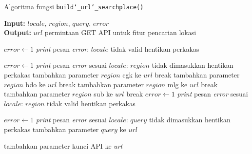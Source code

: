 \begin{algorithm}[h]
	\caption{\textendash\xspace Algoritma fungsi \texttt{build\char`_url\char`_searchplace()}}
	\label{alg:design-buildurl-searchplace}
	\vspace{-0.6\baselineskip}
	\begin{flushleft}
        \textbf{Input:} $locale$, $region$, $query$, $error$ \\
        \textbf{Output:} $url$ permintaan GET API untuk fitur pencarian lokasi \\
	\end{flushleft}
	\vspace{-1.05\baselineskip}
	\begin{algorithmic}
		    \State $error \gets 1$
			\State \textit{print} pesan \textit{error}: $locale$ tidak valid
			\State hentikan perkakas
		\EndIf
		
				\State $error \gets 1$
				\State \textit{print} pesan \textit{error} sesuai $locale$: $region$ tidak dimasukkan
				\State hentikan perkakas
			\EndCase
				\State tambahkan parameter $region$ \textquotesingle\textquotesingle cgk\textquotesingle\textquotesingle\xspace ke $url$
				\State break
			\EndCase
				\State tambahkan parameter $region$ \textquotesingle\textquotesingle bdo\textquotesingle\textquotesingle\xspace ke $url$
				\State break
			\EndCase
				\State tambahkan parameter $region$ \textquotesingle\textquotesingle mlg\textquotesingle\textquotesingle\xspace ke $url$
				\State break
			\EndCase
				\State tambahkan parameter $region$ \textquotesingle\textquotesingle sub\textquotesingle\textquotesingle\xspace ke $url$
				\State break
			\EndCase
			\Default
				\State $error \gets 1$
				\State \textit{print} pesan \textit{error} sesuai $locale$: $region$ tidak valid
				\State hentikan perkakas
			\EndDefault
		\EndSwitch
		
		    \State $error \gets 1$
			\State \textit{print} pesan \textit{error} sesuai $locale$: $query$ tidak dimasukkan
			\State hentikan perkakas
		\Else
			\State tambahkan parameter $query$ ke $url$
		\EndIf
		
		\State tambahkan parameter kunci API ke $url$
		
		\State {}
	\end{algorithmic}
\end{algorithm}

